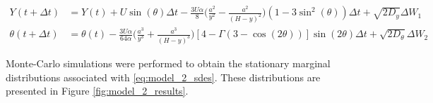 \begin{subequations}\label{eq:model_2_sdes}
    \begin{align}
        Y(t + \Delta t) &= Y(t) + U \sin(\theta)\Delta t - \frac{3U\alpha}{8}\big(\frac{a^2}{y^2}-\frac{a^2}{(H-y)^2}\big)
        (1-3\sin^2(\theta))\Delta t + \sqrt{2D_y}\Delta W_1 \\
        \theta(t + \Delta t) &= \theta(t) -\frac{3U\alpha}{64\alpha} \big(\frac{a^3}{y^3} + 
        \frac{a^3}{(H-y)^3}\big)[4-\Gamma(3-\cos(2\theta))]
        \sin(2\theta) \Delta t + \sqrt{2D_{\theta}}\Delta W_2
     \end{align}
\end{subequations}

Monte-Carlo simulations were performed to obtain the stationary marginal
distributions associated with \eqref{eq:model_2_sdes}. 
These distributions are presented in Figure \ref{fig:model_2_results}.

